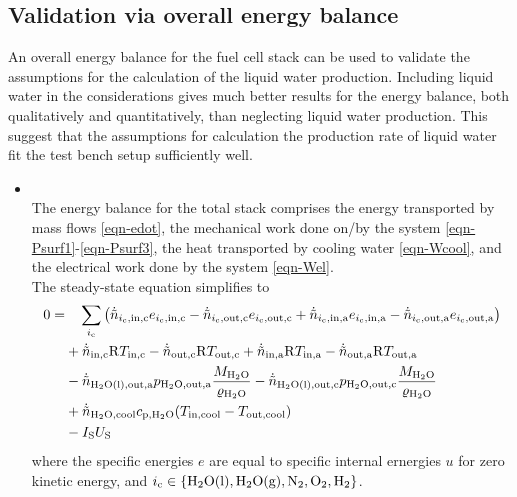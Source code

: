 \subsection{Validation via overall energy balance}
%
An overall energy balance for the fuel cell stack can be used to validate the assumptions for the calculation of the liquid water production.
Including liquid water in the considerations gives much better results for the energy balance, both qualitatively and quantitatively, than neglecting liquid water production.
This suggest that the assumptions for calculation the production rate of liquid water fit the test bench setup sufficiently well.
%
\begin{itemize}
    \item {}\\
        The energy balance for the total stack comprises the energy transported by mass flows \eqref{eqn-edot}, the mechanical work done on/by the system \eqref{eqn-Psurf1}-\eqref{eqn-Psurf3}, the heat transported by cooling water \eqref{eqn-Wcool}, and the electrical work done by the system \eqref{eqn-Wel}.\\
        The steady-state equation simplifies to
         \begin{align}
         0 = &\quad\sum\limits_{i_{\mathrm{c}}} \left( \dot{\tilde n}_{i_{\mathrm{c}},\mathrm{in,c}} e_{i_{\mathrm{c}},\mathrm{in,c}} - \dot{\tilde n}_{i_{\mathrm{c}},\mathrm{out,c}} e_{i_{\mathrm{c}},\mathrm{out,c}} + \dot{\tilde n}_{i_{\mathrm{c}},\mathrm{in,a}} e_{i_{\mathrm{c}},\mathrm{in,a}} - \dot{\tilde n}_{i_{\mathrm{c}},\mathrm{out,a}} e_{i_{\mathrm{c}},\mathrm{out,a}} \right) \label{eqn-edot}\\
             &+ \dot{\tilde n}_{\mathrm{in,c}} \mathrm{R} T_{\mathrm{in,c}} - \dot{\tilde n}_{\mathrm{out,c}} \mathrm{R} T_{\mathrm{out,c}}
              + \dot{\tilde n}_{\mathrm{in,a}} \mathrm{R} T_{\mathrm{in,a}} - \dot{\tilde n}_{\mathrm{out,a}} \mathrm{R} T_{\mathrm{out,a}} \label{eqn-Psurf1}\\
             &- \dot{\tilde n}_{\mathrm{H_2O(l),out,a}} p_{\mathrm{H_2O,out,a}} \frac{ M_{\mathrm{H_2O}}}{\varrho_{\mathrm{H_2O}}}
              - \dot{\tilde n}_{\mathrm{H_2O(l),out,c}} p_{\mathrm{H_2O,out,c}} \frac{ M_{\mathrm{H_2O}}}{\varrho_{\mathrm{H_2O}}}\label{eqn-Psurf3}\\
             &+ \dot{\tilde n}_{\mathrm{H_2O,cool}} c_{\mathrm{p,H_2O}} (T_{\mathrm{in,cool}}-T_{\mathrm{out,cool}}) \label{eqn-Wcool}\\
             &- I_{\mathrm{S}} U_{\mathrm{S}} \label{eqn-Wel}
        \end{align}
       where the specific energies $e$ are equal to specific internal ernergies $u$ for zero kinetic energy, and $i_{\mathrm{c}} \in \{\mathrm{H_2O(l)},\mathrm{H_2O(g)},\mathrm{N_2},\mathrm{O_2},\mathrm{H_2} \}$.\\

\end{itemize}
